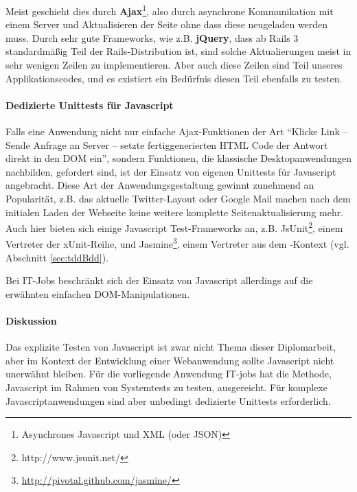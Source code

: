 Meist geschieht dies durch \textbf{Ajax}\footnote{Asynchrones Javascript und XML (oder JSON)}, also durch asynchrone Kommunikation mit einem Server und Aktualisieren der Seite ohne dass diese neugeladen werden muss. Durch sehr gute Frameworks, wie z.B. \textbf{jQuery}, dass ab Rails 3 standardmäßig Teil der Rails-Distribution ist, sind solche Aktualierungen meist in sehr wenigen Zeilen zu implementieren. Aber auch diese Zeilen sind Teil unseres Applikationscodes, und es existiert ein Bedürfnis diesen Teil ebenfalls zu testen.


\paragraph{Dedizierte Unittests für Javascript} Falls eine Anwendung nicht nur einfache Ajax-Funktionen der Art "`Klicke Link -- Sende Anfrage an Server -- setzte fertiggenerierten HTML Code der Antwort direkt in den DOM ein"', sondern Funktionen, die klassische Desktopanwendungen nachbilden, gefordert sind, ist der Einsatz von eigenen Unittests für Javascript angebracht.
Diese Art der Anwendungsgestaltung gewinnt zunehmend an Popularität, z.B. das aktuelle Twitter-Layout oder Google Mail machen nach dem initialen Laden der Webseite keine weitere komplette Seitenaktualisierung mehr. 
Auch hier bieten sich einige Javascript Test-Frameworks an, z.B. JsUnit\footnote{http://www.jsunit.net/}, einem Vertreter der xUnit-Reihe, und Jasmine\footnote{\url{http://pivotal.github.com/jasmine/}}, einem Vertreter aus dem -Kontext (vgl. Abschnitt \ref{sec:tddBdd}). 

Bei IT-Jobs beschränkt sich der Einsatz von Javascript allerdings auf die erwähnten einfachen DOM-Manipulationen.

\paragraph{Diskussion} Das explizite Testen von Javascript ist zwar nicht Thema dieser Diplomarbeit, aber im Kontext der Entwicklung einer Webanwendung sollte Javascript nicht unerwähnt bleiben. Für die vorliegende Anwendung IT-jobs hat die Methode, Javascript im Rahmen von Systemtests zu testen, ausgereicht. Für komplexe Javascriptanwendungen sind aber unbedingt dedizierte Unittests erforderlich.
